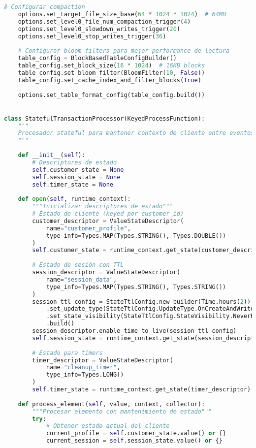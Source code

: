\begin{lstlisting}[language=python, caption=Configuración Optimizada de Estado y Checkpointing, label=lst:flink_checkpointing]
    # Configurar compaction
    options.set_target_file_size_base(64 * 1024 * 1024)  # 64MB
    options.set_level0_file_num_compaction_trigger(4)
    options.set_level0_slowdown_writes_trigger(20)
    options.set_level0_stop_writes_trigger(36)
    
    # Configurar bloom filters para mejor performance de lectura
    table_config = BlockBasedTableConfigBuilder()
    table_config.set_block_size(16 * 1024)  # 16KB blocks
    table_config.set_bloom_filter(BloomFilter(10, False))
    table_config.set_cache_index_and_filter_blocks(True)
    
    options.set_table_format_config(table_config.build())


class StatefulTransactionProcessor(KeyedProcessFunction):
    """
    Procesador stateful para mantener contexto de cliente entre eventos
    """
    
    def __init__(self):
        # Descriptores de estado
        self.customer_state = None
        self.session_state = None
        self.timer_state = None
    
    def open(self, runtime_context):
        """Inicializar descriptores de estado"""
        # Estado de cliente (keyed por customer_id)
        customer_descriptor = ValueStateDescriptor(
            name="customer_profile",
            type_info=Types.MAP(Types.STRING(), Types.DOUBLE())
        )
        self.customer_state = runtime_context.get_state(customer_descriptor)
        
        # Estado de sesión con TTL
        session_descriptor = ValueStateDescriptor(
            name="session_data",
            type_info=Types.MAP(Types.STRING(), Types.STRING())
        )
        session_ttl_config = StateTtlConfig.new_builder(Time.hours(2)) \
            .set_update_type(StateTtlConfig.UpdateType.OnCreateAndWrite) \
            .set_state_visibility(StateTtlConfig.StateVisibility.NeverReturnExpired) \
            .build()
        session_descriptor.enable_time_to_live(session_ttl_config)
        self.session_state = runtime_context.get_state(session_descriptor)
        
        # Estado para timers
        timer_descriptor = ValueStateDescriptor(
            name="cleanup_timer",
            type_info=Types.LONG()
        )
        self.timer_state = runtime_context.get_state(timer_descriptor)
    
    def process_element(self, value, context, collector):
        """Procesar elemento con mantenimiento de estado"""
        try:
            # Obtener estado actual del cliente
            current_profile = self.customer_state.value() or {}
            current_session = self.session_state.value() or {}
            

\end{lstlisting}
